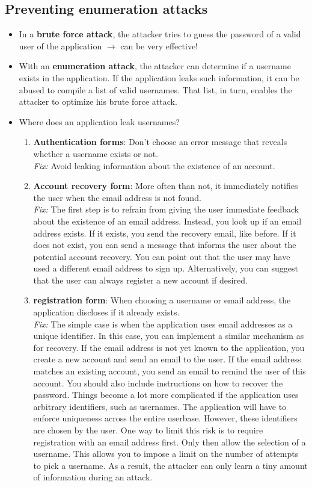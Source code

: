 \documentclass[../main.tex]{subfiles}
\begin{document}
\subsection{Preventing enumeration attacks}
\begin{itemize}
\item In a \textbf{brute force attack}, the attacker tries to guess the password of a valid user of the application $\rightarrow$ can be very effective!
\item With an \textbf{enumeration attack}, the attacker can determine if a username exists in the application. If the application leaks such information, it can be abused to compile a list of valid usernames. That list, in turn, enables the attacker to optimize his brute force attack.
\item Where does an application leak usernames?
\begin{enumerate}
\item \textbf{Authentication forms}: Don't choose an error message that reveals whether a username exists or not.\\
\emph{Fix:} Avoid leaking information about the existence of an account.
\item \textbf{Account recovery form}: More often than not, it immediately notifies the user when the email address is not found.\\
\emph{Fix:} The first step is to refrain from giving the user immediate feedback about the existence of an email address. Instead, you look up if an email address exists. If it exists, you send the recovery email, like before. If it does not exist, you can send a message that informs the user about the potential account recovery. You can point out that the user may have used a different email address to sign up. Alternatively, you can suggest that the user can always register a new account if desired.
\item \textbf{registration form}: When choosing a username or email address, the application discloses if it already exists.\\
\emph{Fix:} The simple case is when the application uses email addresses as a unique identifier. In this case, you can implement a similar mechanism as for recovery. If the email address is not yet known to the application, you create a new account and send an email to the user. If the email address matches an existing account, you send an email to remind the user of this account. You should also include instructions on how to recover the password. Things become a lot more complicated if the application uses arbitrary identifiers, such as usernames. The application will have to enforce uniqueness across the entire userbase. However, these identifiers are chosen by the user. One way to limit this risk is to require registration with an email address first. Only then allow the selection of a username. This allows you to impose a limit on the number of attempts to pick a username. As a result, the attacker can only learn a tiny amount of information during an attack.

\end{enumerate}
\end{itemize}
\end{document}
